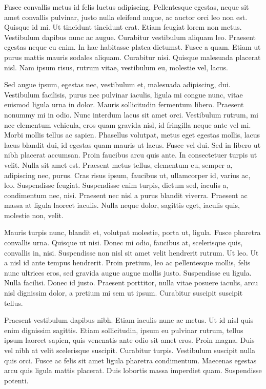 \begin{multicols}{2}
Fusce convallis metus id felis luctus adipiscing. Pellentesque
egestas, neque sit amet convallis pulvinar, justo nulla eleifend
augue, ac auctor orci leo non est. Quisque id mi. Ut tincidunt
tincidunt erat. Etiam feugiat lorem non metus. Vestibulum dapibus nunc
ac augue. Curabitur vestibulum aliquam leo. Praesent egestas neque eu
enim. In hac habitasse platea dictumst. Fusce a quam. Etiam ut purus
mattis mauris sodales aliquam. Curabitur nisi. Quisque malesuada
placerat nisl. Nam ipsum risus, rutrum vitae, vestibulum eu, molestie
vel, lacus.

Sed augue ipsum, egestas nec, vestibulum et, malesuada adipiscing,
dui. Vestibulum facilisis, purus nec pulvinar iaculis, ligula mi
congue nunc, vitae euismod ligula urna in dolor. Mauris sollicitudin
fermentum libero. Praesent nonummy mi in odio. Nunc interdum lacus sit
amet orci. Vestibulum rutrum, mi nec elementum vehicula, eros quam
gravida nisl, id fringilla neque ante vel mi. Morbi mollis tellus ac
sapien. Phasellus volutpat, metus eget egestas mollis, lacus lacus
blandit dui, id egestas quam mauris ut lacus. Fusce vel dui. Sed in
libero ut nibh placerat accumsan. Proin faucibus arcu quis ante. In
consectetuer turpis ut velit. Nulla sit amet est. Praesent metus
tellus, elementum eu, semper a, adipiscing nec, purus. Cras risus
ipsum, faucibus ut, ullamcorper id, varius ac, leo. Suspendisse
feugiat. Suspendisse enim turpis, dictum sed, iaculis a, condimentum
nec, nisi. Praesent nec nisl a purus blandit viverra. Praesent ac
massa at ligula laoreet iaculis. Nulla neque dolor, sagittis eget,
iaculis quis, molestie non, velit.

Mauris turpis nunc, blandit et, volutpat molestie, porta ut, ligula.
Fusce pharetra convallis urna. Quisque ut nisi. Donec mi odio,
faucibus at, scelerisque quis, convallis in, nisi. Suspendisse non
nisl sit amet velit hendrerit rutrum. Ut leo. Ut a nisl id ante tempus
hendrerit. Proin pretium, leo ac pellentesque mollis, felis nunc
ultrices eros, sed gravida augue augue mollis justo. Suspendisse eu
ligula. Nulla facilisi. Donec id justo. Praesent porttitor, nulla
vitae posuere iaculis, arcu nisl dignissim dolor, a pretium mi sem ut
ipsum. Curabitur suscipit suscipit tellus.

Praesent vestibulum dapibus nibh. Etiam iaculis nunc ac metus. Ut id
nisl quis enim dignissim sagittis. Etiam sollicitudin, ipsum eu
pulvinar rutrum, tellus ipsum laoreet sapien, quis venenatis ante odio
sit amet eros. Proin magna. Duis vel nibh at velit scelerisque
suscipit. Curabitur turpis. Vestibulum suscipit nulla quis orci. Fusce
ac felis sit amet ligula pharetra condimentum. Maecenas egestas arcu
quis ligula mattis placerat. Duis lobortis massa imperdiet quam.
Suspendisse potenti.


\end{multicols}
